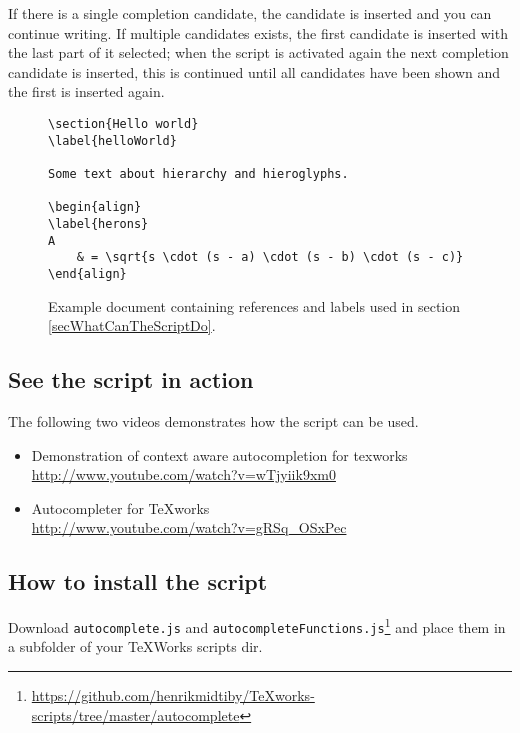 \documentclass[a4paper]{article}
\begin{document}
If there is a single completion candidate, the candidate is inserted 
and you can continue writing.
If multiple candidates exists, the first candidate is inserted with 
the last part of it selected; when the script is activated again the 
next completion candidate is inserted, this is continued until all 
candidates have been shown and the first is inserted again.



\begin{figure}[t]
\centering
\begin{verbatim}
\section{Hello world}
\label{helloWorld}

Some text about hierarchy and hieroglyphs.

\begin{align}
\label{herons}
A
	& = \sqrt{s \cdot (s - a) \cdot (s - b) \cdot (s - c)}
\end{align}
\end{verbatim}
\caption{Example document containing references and labels used in section \ref{secWhatCanTheScriptDo}.}
\label{figExampleDocument}
\end{figure}

\subsection{See the script in action}
\label{ssecSeeTheScriptInAction}

The following two videos demonstrates how the script can be used.
%
\begin{itemize}
\item	Demonstration of context aware autocompletion for texworks\\
		\url{http://www.youtube.com/watch?v=wTjyiik9xm0}
\item	Autocompleter for TeXworks\\
		\url{http://www.youtube.com/watch?v=gRSq_OSxPec}
\end{itemize}


\subsection{How to install the script}
\label{ssecHowToInstallTheScript}

Download \texttt{autocomplete.js} and 
\texttt{autocompleteFunctions.js}\footnote{\url{https://github.com/henrikmidtiby/TeXworks-scripts/tree/master/autocomplete}} and place them in a subfolder of your 
TeXWorks scripts dir.
\end{document}
